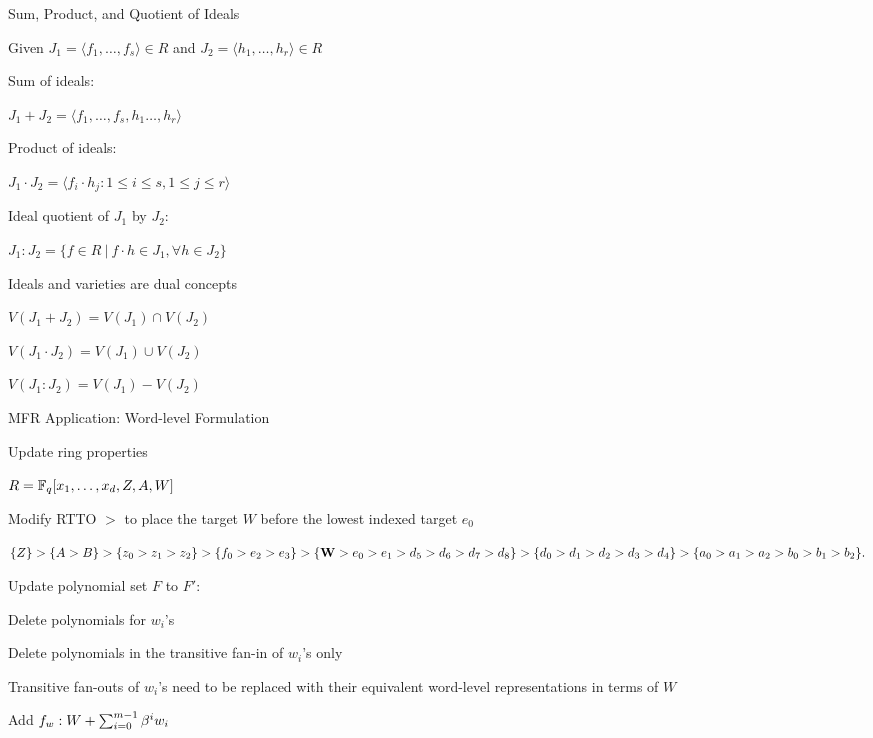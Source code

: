 \begin{frame}{\large Sum, Product, and Quotient of Ideals}
\begin{center}
Given $J_1 = \langle f_1,\dots,f_s\rangle \in R$ and $J_2=\langle h_1,\dots,h_r\rangle \in R$
\end{center}
\bi 
\item Sum of ideals:
\bi
	\item $J_1 + J_2 = \langle f_1,\dots,f_s, h_1\dots,h_r\rangle$
\ei
\item Product of ideals:
\bi
\item $J_1\cdot J_2 = \langle f_i\cdot h_j: 1\leq i\leq s, 1\leq j\leq r\rangle$
\ei

\item Ideal quotient of $J_1$ by $J_2$:
\bi
\item $J_1:J_2 = \{f \in R \ |\ f\cdot h \in J_1, \forall h \in J_2\}$
\ei

\item Ideals and varieties are dual concepts
\bi
\item $V(J_1 + J_2) = V(J_1) \cap V(J_2)$
\item $V(J_1\cdot J_2) = V(J_1) \cup V(J_2)$
\item $V(J_1:J_2) = V(J_1)-V(J_2)$
\ei
\ei

\end{frame}

\begin{frame}{\large MFR Application: Word-level Formulation}
\bi
	\item Update ring properties 
	\bi
		\item $R={\mathbb{F}}_q[x_1,\dots,x_d,Z,A,W]$
		\item Modify RTTO $>$ to place the target $W$ before the lowest indexed target $e_0$
		\bi
			\item $\{Z\}>\{A>B\}>\{z_0>z_1>z_2\}>\{f_0>e_2>e_3\}>\{{\bf{W}}>e_0>e_1>d_5>d_6>d_7>d_8\}>
				\{d_0>d_1>d_2>d_3>d_4\}>\{a_0>a_1>a_2>b_0>b_1>b_2\}.$
		\ei
	\ei
	\vspace{0.1in}
	\item Update polynomial set $F$ to $F'$:
	\bi
		\item Delete polynomials for $w_i$'s
		\item Delete polynomials in the transitive fan-in of $w_i$'s only
		\item Transitive fan-outs of $w_i$'s need to be replaced with their equivalent 
		word-level representations in terms of $W$
		\item Add $f_w: W + \sum_{i=0}^{m-1}\beta^iw_i$
	\ei

\ei
\end{frame}